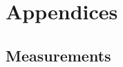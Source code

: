 \part{Appendices}
\label{Appendices}
\begin{appendices}
















\chapter{Measurements}







\end{appendices}



